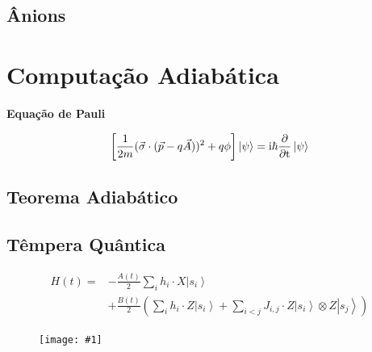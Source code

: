\documentclass[t]{beamer}
\newcommand{\ii}{
	\rm{i}
}
\newcommand{\titulo}[1]{%
	\textbf{\Large #1\\}
}
\newcommand{\ket}[1]{\ensuremath{\left|#1\right\rangle}}
\newcommand{\imgw}[2]{%
\begin{center}
	\begin{figure}
	\texttt{[image: \#1]}\\
	\end{figure}
\end{center}
}
\begin{document}
	\begin{frame}{\subsecname}
	
	\end{frame}
	
	\subsection{Ânions}
	
	\begin{frame}{\subsecname}
	
	\end{frame}	
	
	\begin{frame}{\subsecname}
	
	\end{frame}
	
	\section{Computação Adiabática}
	
	\begin{frame}{\secname}
	\titulo{Equação de Pauli}
	$$\left[{\frac {1}{2m}}({\vec {\sigma }}\cdot ({\vec {p}}-q{\vec {A}}))^{2}+q\phi \right]\ket{\psi} = \ii\hbar {\frac {\partial }{\partial t}}\ket{\psi}$$
	
	\end{frame}
	
	\subsection{Teorema Adiabático}
	
	\subsection{Têmpera Quântica}	
	
	\begin{frame}{\subsecname}
		\begin{align*}
			H(t) = &-\frac{A(t)}{2}  \sum_{i} h_i \cdot X\ket{s_i}\\ &+ \frac{B(t)}{2}\left(\sum_{i} h_i \cdot Z\ket{s_i} + \sum_{i < j} J_{i,j} \cdot Z\ket{s_i} \otimes Z\ket{s_j}\right)
		\end{align*}
	\end{frame}
	
	\begin{frame}{\subsecname}
		\imgw{energy-levels.pdf}{7cm}
	\end{frame}
	
\end{document}
